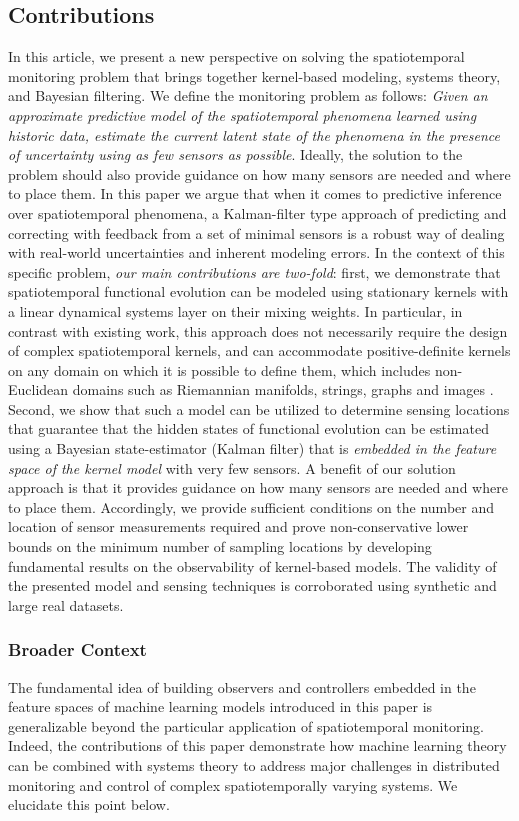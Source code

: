 \subsection{Contributions}
In this article, we present a new perspective on solving the spatiotemporal monitoring problem that brings together kernel-based modeling, systems theory, and Bayesian filtering. We define the monitoring problem as follows: \textit{Given an approximate predictive model of the spatiotemporal phenomena learned using historic data, estimate the current latent state of the phenomena in the presence of uncertainty using as few sensors as possible}. Ideally, the solution to the problem should also provide guidance on how many sensors are needed and where to place them. In this paper we argue that when it comes to predictive inference over spatiotemporal phenomena, a Kalman-filter type approach of predicting and correcting with feedback from a set of minimal sensors is a robust way of dealing with real-world uncertainties and inherent modeling errors.  In the context of this specific problem, \textit{our main contributions are two-fold}: first, we demonstrate that spatiotemporal functional evolution can be modeled using stationary kernels with a linear dynamical systems layer on their mixing weights. In particular, in contrast with existing work, this approach does not necessarily require the design of complex spatiotemporal kernels, and can accommodate positive-definite kernels on any domain on which it is possible to define them, which includes non-Euclidean domains such as Riemannian manifolds, strings, graphs and images \cite{Jayasumana_PAMI2015_RBFs}. Second, we show that such a model can be utilized to determine sensing locations that guarantee that the hidden states of functional evolution can be estimated using a Bayesian state-estimator (Kalman filter) that is \textit{embedded in the feature space of the kernel model} with very few sensors. A benefit of our solution approach is that it provides guidance on how many sensors are needed and where to place them. Accordingly, we provide sufficient conditions on the number and location of sensor measurements required and prove non-conservative lower bounds on the minimum number of sampling locations by developing fundamental results on the observability of kernel-based models. The validity of the presented model and sensing techniques is corroborated using synthetic and large real datasets. 

\subsubsection*{Broader Context}
The fundamental idea of building observers and controllers embedded in the feature spaces of machine learning models introduced in this paper is generalizable beyond the particular application of spatiotemporal monitoring. Indeed, the contributions of this paper demonstrate how machine learning theory can be combined with systems theory to address major challenges in distributed monitoring and control of complex spatiotemporally varying systems. We elucidate this point below.

